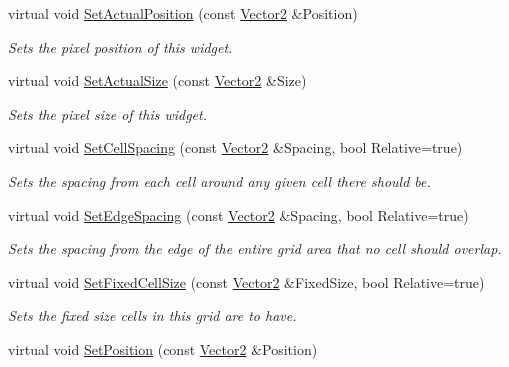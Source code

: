 \begin{DoxyCompactItemize}
virtual void \hyperlink{classMezzanine_1_1UI_1_1CellGrid_aec72d4eae4497e7ffa62f7697d4dc468}{SetActualPosition} (const \hyperlink{classMezzanine_1_1Vector2}{Vector2} \&Position)
\begin{DoxyCompactList}\small\item\em Sets the pixel position of this widget. \item\end{DoxyCompactList}\item 
virtual void \hyperlink{classMezzanine_1_1UI_1_1CellGrid_a2ab8b9b913aaac889ea76e565eccdbc6}{SetActualSize} (const \hyperlink{classMezzanine_1_1Vector2}{Vector2} \&Size)
\begin{DoxyCompactList}\small\item\em Sets the pixel size of this widget. \item\end{DoxyCompactList}\item 
virtual void \hyperlink{classMezzanine_1_1UI_1_1CellGrid_a02fe0c290a43950565fc5b9dc4285212}{SetCellSpacing} (const \hyperlink{classMezzanine_1_1Vector2}{Vector2} \&Spacing, bool Relative=true)
\begin{DoxyCompactList}\small\item\em Sets the spacing from each cell around any given cell there should be. \item\end{DoxyCompactList}\item 
virtual void \hyperlink{classMezzanine_1_1UI_1_1CellGrid_a9b086636cf3b6830db5948a24380ee1a}{SetEdgeSpacing} (const \hyperlink{classMezzanine_1_1Vector2}{Vector2} \&Spacing, bool Relative=true)
\begin{DoxyCompactList}\small\item\em Sets the spacing from the edge of the entire grid area that no cell should overlap. \item\end{DoxyCompactList}\item 
virtual void \hyperlink{classMezzanine_1_1UI_1_1CellGrid_aae3aa4503b5673470a83dd9edd445e77}{SetFixedCellSize} (const \hyperlink{classMezzanine_1_1Vector2}{Vector2} \&FixedSize, bool Relative=true)
\begin{DoxyCompactList}\small\item\em Sets the fixed size cells in this grid are to have. \item\end{DoxyCompactList}\item 
virtual void \hyperlink{classMezzanine_1_1UI_1_1CellGrid_ab6e210edb5ec0167f61c9dc2dafef108}{SetPosition} (const \hyperlink{classMezzanine_1_1Vector2}{Vector2} \&Position)

\end{DoxyCompactItemize}

